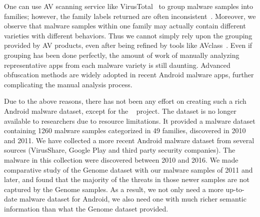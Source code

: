 One can use AV scanning service like
VirusTotal~\cite{virustotal} to group malware samples into families;
however, the family labels returned are often
inconsistent~\cite{hurier2016lack,sebastian2016avclass}.
Moreover, we observe that malware samples within one family
may actually contain different varieties with different behaviors.
Thus we cannot simply rely upon the grouping provided by AV products, even after being refined
by tools like AVclass~\cite{sebastian2016avclass}.
Even if grouping has been done perfectly, the amount of work of manually analyzing
representative apps from each malware variety is still daunting.
Advanced obfuscation methods are
widely adopted in recent Android malware apps, further complicating the manual
analysis process.




Due to the above reasons, there has not been any effort on creating such a
rich Android malware dataset, except for the 
\genome~\cite{zhou2012dissecting} project.
The \genome dataset is no longer
available to researchers due to resource limitations.
It provided a malware dataset containing
1260 malware samples categorized in 49 families,
discovered in 2010 and 2011.
We have collected a more recent Android malware dataset from several 
sources (VirusShare, Google Play and third party security companies).
The malware in this collection were discovered between 2010 and 2016. 
We made comparative study of the Genome dataset with our malware samples of 2011 and later,
and found that the majority of the threats in those newer samples are not captured by the 
Genome samples. As a result, we not only need a more up-to-date malware dataset for Android,
we also need one with much richer semantic information than what the Genome dataset provided.



